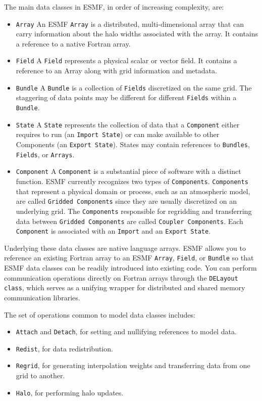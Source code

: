 The main data classes in ESMF, in order of increasing complexity, are:
\begin{itemize}
\item {\tt Array} An ESMF {\tt Array} is a distributed, multi-dimensional array
that can carry information about the halo widths associated with the array.  
It contains a reference to a native Fortran array.
\item {\tt Field}  A {\tt Field} represents a physical scalar or vector field.
It contains a reference to an Array along with grid information and metadata.
\item {\tt Bundle}  A {\tt Bundle} is a collection of {\tt Fields} discretized 
on the same grid.  The staggering of data points may be different for 
different {\tt Fields} within a {\tt Bundle}.
\item {\tt State}  A {\tt State} represents the collection of data that a 
{\tt Component} either requires to run (an {\tt Import State}) or can make 
available to other Components (an {\tt Export State}).
States may contain references to {\tt Bundles}, {\tt Fields}, or {\tt Arrays}. 
\item {\tt Component}  A {\tt Component} is a substantial piece of software 
with a distinct function.  ESMF currently recognizes two types 
of {\tt Components}.  {\tt Components} that represent a physical domain 
or process, such 
as an atmospheric model, are called {\tt Gridded Components} since they are 
usually discretized on an underlying grid.  The {\tt Components} 
responsible for regridding and transferring data between {\tt Gridded 
Components} are called {\tt Coupler Components}.  Each {\tt Component}
is associated with an {\tt Import} and an {\tt Export State}.  
\end{itemize}

Underlying these data classes are native language arrays.  ESMF allows 
you to reference an existing Fortran array to an ESMF {\tt Array}, 
{\tt Field}, or {\tt Bundle} so that ESMF data classes can be readily 
introduced into existing code.  You can perform communication operations 
directly on Fortran arrays through the {\tt DELayout class}, which serves 
as a unifying wrapper for distributed and shared memory communication 
libraries.

The set of operations common to model data classes includes: 
\begin{itemize}
\item {\tt Attach} and {\tt Detach}, for setting and nullifying 
references to model data.
\item {\tt Redist}, for data redistribution.
\item {\tt Regrid}, for generating interpolation weights and transferring
data from one grid to another.
\item {\tt Halo}, for performing halo updates.
\end{itemize}

